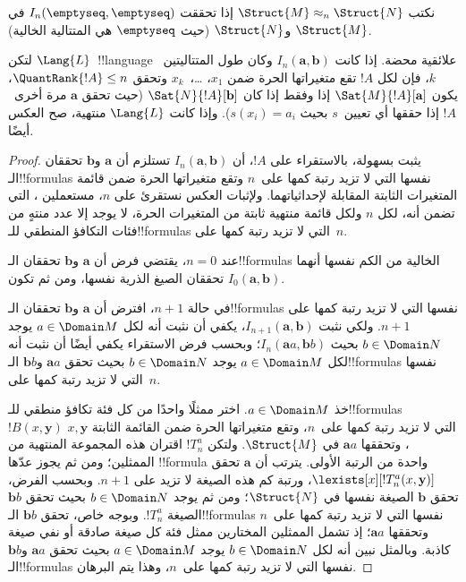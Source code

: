 \documentclass[../../../include/open-logic-section]{subfiles}
\begin{document}
\begin{defn}
  نكتب $\Struct{M} \approx_n \Struct{N}$ إذا تحققت
  $I_n(\emptyseq,\emptyseq)$ في $\Struct{M}$ و$\Struct{N}$ (حيث
  $\emptyseq$ هي المتتالية الخالية).
\end{defn}

\begin{thm}
  لتكن $\Lang{L}$~!!{language} علائقية محضة. إذا كانت
  $I_n(\mathbf{a},\mathbf{b})$ وكان طول المتتاليتين~$k$، فإن لكل $!A$
  تقع متغيراتها الحرة ضمن $x_1$، \dots،~$x_k$ وتحقق
  $\QuantRank{!A} \le n$، يكون $\Sat{M}{!A}[\mathbf{a}]$ إذا وفقط إذا
  كان $\Sat{N}{!A}[\mathbf{b}]$ (حيث تحقق $\mathbf{a}$ مرة أخرى~$!A$
  إذا حققها أي تعيين~$s$ بحيث $s(x_i)=a_i$). وإذا كانت $\Lang{L}$
  منتهية، صح العكس أيضًا.
\end{thm}

\begin{proof}
  يثبت بسهولة، بالاستقراء على $!A$، أن
  $I_n(\mathbf{a},\mathbf{b})$ تستلزم أن $\mathbf{a}$ و$\mathbf{b}$
  تحققان الـ!!{formula}s نفسها التي لا تزيد رتبة كمها على~$n$ وتقع
  متغيراتها الحرة ضمن قائمة المتغيرات الثابتة المقابلة لإحداثياتهما.
  ولإثبات العكس نستقرئ على $n$، مستعملين
  ، التي تضمن أنه، لكل $n$ ولكل قائمة منتهية ثابتة
  من المتغيرات الحرة، لا يوجد إلا عدد منتهٍ من فئات التكافؤ المنطقي
  للـ!!{formula}s التي لا تزيد رتبة كمها على~$n$.

  عند $n=0$، يقتضي فرض أن $\mathbf{a}$ و$\mathbf{b}$ تحققان
  الـ!!{formula}s الخالية من الكم نفسها أنهما تحققان الصيغ الذرية نفسها،
  ومن ثم تكون $I_0(\mathbf{a},\mathbf{b})$.

  في حالة $n+1$، افترض أن $\mathbf{a}$ و$\mathbf{b}$ تحققان
  الـ!!{formula}s نفسها التي لا تزيد رتبة كمها على $n+1$. ولكي نثبت
  $I_{n+1}(\mathbf{a},\mathbf{b})$، يكفي أن نثبت أنه لكل
  $a \in \Domain M$ يوجد $b \in \Domain N$ بحيث
  $I_n(\mathbf{a}a,\mathbf{b}b)$؛ وبحسب فرض الاستقراء يكفي أيضًا أن
  نثبت أنه لكل $a \in \Domain M$ يوجد $b \in \Domain N$ بحيث تحقق
  $\mathbf{a}a$ و$\mathbf{b}b$ الـ!!{formula}s نفسها التي لا تزيد رتبة
  كمها على~$n$.

  خذ $a \in \Domain M$. اختر ممثلًا واحدًا من كل فئة تكافؤ منطقي
  للـ!!{formula}s~$!B(x,\mathbf{y})$ التي لا تزيد رتبة كمها على~$n$،
  وتقع متغيراتها الحرة ضمن القائمة الثابتة $x,\mathbf{y}$، وتحققها
  $\mathbf{a}a$ في $\Struct{M}$. ولتكن $!T^a_n$ اقتران هذه المجموعة
  المنتهية من الممثلين؛ ومن ثم يجوز عدّها !!{formula} واحدة من الرتبة
  الأولى. يترتب أن $\mathbf{a}$ تحقق
  $\lexists[x][!T^a_n(x,\mathbf{y})]$، ورتبة كم هذه الصيغة لا تزيد على
  $n+1$. وبحسب الفرض، تحقق $\mathbf{b}$ الصيغة نفسها في $\Struct{N}$؛
  ومن ثم يوجد $b \in \Domain N$ بحيث تحقق $\mathbf{b}b$ الصيغة
  $!T^a_n$. وبوجه خاص، تحقق $\mathbf{b}b$ الـ!!{formula}s نفسها التي
  لا تزيد رتبة كمها على~$n$ وتحققها $\mathbf{a}a$؛ إذ تشمل الممثلين
  المختارين ممثل فئة كل صيغة صادقة أو نفي صيغة كاذبة. وبالمثل نبين أنه
  لكل $b \in \Domain N$ يوجد $a\in \Domain M$ بحيث تحقق
  $\mathbf{a}a$ و$\mathbf{b}b$ الـ!!{formula}s نفسها التي لا تزيد رتبة
  كمها على~$n$، وهذا يتم البرهان.
\end{proof}
\end{document}
